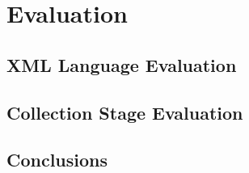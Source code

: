 	\chapter{Evaluation}\label{ch:evaluation}
		
	\section{XML Language Evaluation}\label{sec:eval:xmlEvaluation}
		
	\section{Collection Stage Evaluation}\label{sec:eval:collectionStageEvaluation}
		
	\section{Conclusions}
		


